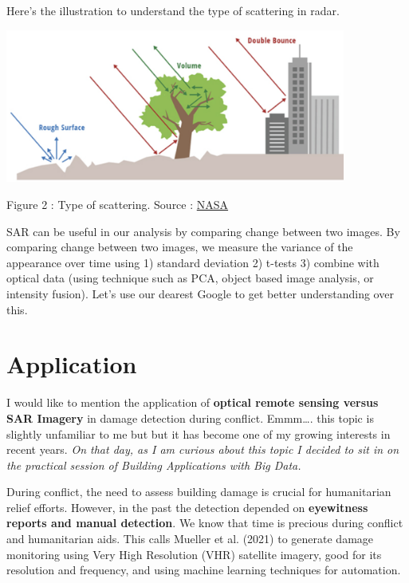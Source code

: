 \documentclass[
  letterpaper,
  DIV=11,
  numbers=noendperiod]{scrreprt}
\begin{document}
Here's the illustration to understand the type of scattering in radar.

\includegraphics[width=4.40625in,height=\textheight]{images/clipboard-4253915995.png}

Figure 2 : Type of scattering. Source :
\href{https://www.earthdata.nasa.gov/learn/earth-observation-data-basics/sar}{NASA}

SAR can be useful in our analysis by comparing change between two
images. By comparing change between two images, we measure the variance
of the appearance over time using 1) standard deviation 2) t-tests 3)
combine with optical data (using technique such as PCA, object based
image analysis, or intensity fusion). Let's use our dearest Google to
get better understanding over this.

\hypertarget{application-5}{%
\section{Application}\label{application-5}}

I would like to mention the application of \textbf{optical remote
sensing versus SAR Imagery} in damage detection during conflict.
Emmm\ldots. this topic is slightly unfamiliar to me but but it has
become one of my growing interests in recent years. \emph{On that day,
as I am curious about this topic I decided to sit in on the practical
session of Building Applications with Big Data.}

During conflict, the need to assess building damage is crucial for
humanitarian relief efforts. However, in the past the detection depended
on \textbf{eyewitness reports and manual detection}. We know that time
is precious during conflict and humanitarian aids. This calls Mueller et
al. (2021) to generate damage monitoring using Very High Resolution
(VHR) satellite imagery, good for its resolution and frequency, and
using machine learning techniques for automation.
\end{document}
